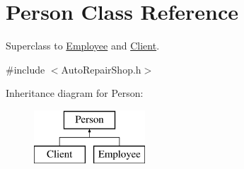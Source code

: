 \hypertarget{class_person}{}\section{Person Class Reference}
\label{class_person}


Superclass to \hyperlink{class_employee}{Employee} and \hyperlink{class_client}{Client}.  




{\ttfamily \#include $<$Auto\+Repair\+Shop.\+h$>$}

Inheritance diagram for Person\+:\begin{figure}[H]
\begin{center}
\leavevmode
\includegraphics[height=2.000000cm]{class_person}
\end{center}
\end{figure}
